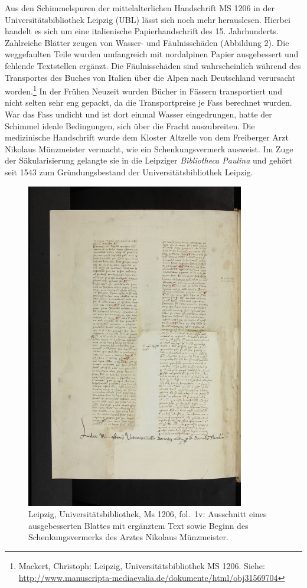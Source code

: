 \documentclass[a4paper,
fontsize=11pt,
oneside,
numbers=noperiodatend,
parskip=half-,
bibliography=totoc,
final
]{scrartcl}
\begin{document}
Aus den Schimmelspuren der mittelalterlichen Handschrift MS 1206 in der
Universitätsbibliothek Leipzig (UBL) lässt sich noch mehr herauslesen.
Hierbei handelt es sich um eine italienische Papierhandschrift des 15.
Jahrhunderts. Zahlreiche Blätter zeugen von Wasser- und Fäulnisschäden
(Abbildung 2). Die weggefaulten Teile wurden umfangreich mit nordalpinen
Papier ausgebessert und fehlende Textstellen ergänzt. Die Fäulnisschäden
sind wahrscheinlich während des Transportes des Buches von Italien über
die Alpen nach Deutschland verursacht worden.\footnote{Mackert,
  Christoph: Leipzig, Universitätsbibliothek MS 1206. Siehe:
  \url{http://www.manuscripta-mediaevalia.de/dokumente/html/obj31569704}}
In der Frühen Neuzeit wurden Bücher in Fässern transportiert und nicht
selten sehr eng gepackt, da die Transportpreise je Fass berechnet
wurden. War das Fass undicht und ist dort einmal Wasser eingedrungen,
hatte der Schimmel ideale Bedingungen, sich über die Fracht
auszubreiten. Die medizinische Handschrift wurde dem Kloster Altzelle
von dem Freiberger Arzt Nikolaus Münzmeister vermacht, wie ein
Schenkungsvermerk ausweist. Im Zuge der Säkularisierung gelangte sie in
die Leipziger \emph{Bibliotheca Paulina} und gehört seit 1543 zum
Gründungsbestand der Universitätsbibliothek Leipzig.

\begin{figure}
\centering
\includegraphics[width=0.85\textwidth]{img/image3.jpg}
\caption{Leipzig,
Universitätsbibliothek, Ms 1206, fol.~1v: Ausschnitt eines
ausgebesserten Blattes mit ergänztem Text sowie Beginn des
Schenkungsvermerks des Arztes Nikolaus Münzmeister.}
\end{figure}
\end{document}
